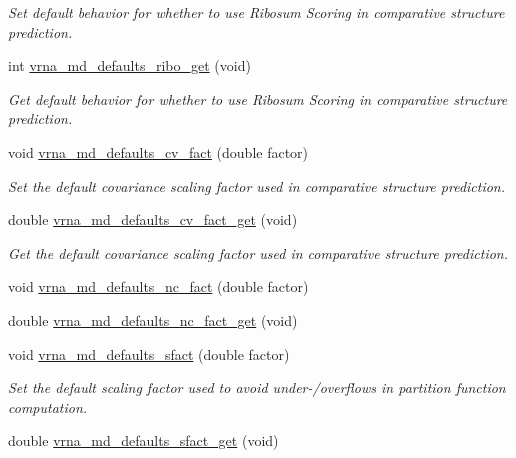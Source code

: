 \begin{DoxyCompactItemize}
\begin{DoxyCompactList}\small\item\em Set default behavior for whether to use Ribosum Scoring in comparative structure prediction. \end{DoxyCompactList}\item 
int \hyperlink{group__model__details_ga169027f0c0561ea7d87b655e4b336bfc}{vrna\+\_\+md\+\_\+defaults\+\_\+ribo\+\_\+get} (void)
\begin{DoxyCompactList}\small\item\em Get default behavior for whether to use Ribosum Scoring in comparative structure prediction. \end{DoxyCompactList}\item 
void \hyperlink{group__model__details_gad3a3f40baafd91a6ce80a91a68e20053}{vrna\+\_\+md\+\_\+defaults\+\_\+cv\+\_\+fact} (double factor)
\begin{DoxyCompactList}\small\item\em Set the default covariance scaling factor used in comparative structure prediction. \end{DoxyCompactList}\item 
double \hyperlink{group__model__details_gae59c68393807217b0a2497adb64d3ee3}{vrna\+\_\+md\+\_\+defaults\+\_\+cv\+\_\+fact\+\_\+get} (void)
\begin{DoxyCompactList}\small\item\em Get the default covariance scaling factor used in comparative structure prediction. \end{DoxyCompactList}\item 
void \hyperlink{group__model__details_gac35e596c850dce3ad55c49119fd7d471}{vrna\+\_\+md\+\_\+defaults\+\_\+nc\+\_\+fact} (double factor)
\item 
double \hyperlink{group__model__details_ga7ac759eaa7159bf5f022745f5da59508}{vrna\+\_\+md\+\_\+defaults\+\_\+nc\+\_\+fact\+\_\+get} (void)
\item 
void \hyperlink{group__model__details_ga3f73d3029d3d0025d4cc311510cd95a3}{vrna\+\_\+md\+\_\+defaults\+\_\+sfact} (double factor)
\begin{DoxyCompactList}\small\item\em Set the default scaling factor used to avoid under-\//overflows in partition function computation. \end{DoxyCompactList}\item 
double \hyperlink{group__model__details_gab2df6aab954b63fd3592d18e90285dae}{vrna\+\_\+md\+\_\+defaults\+\_\+sfact\+\_\+get} (void)

\end{DoxyCompactItemize}
